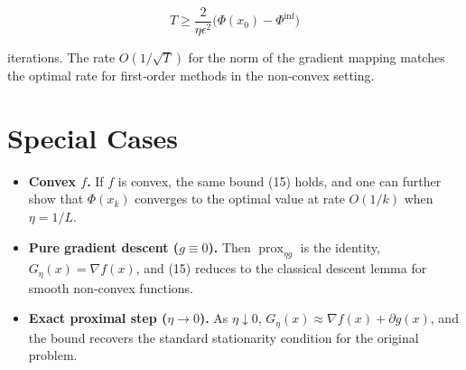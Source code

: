 \documentclass{article}
\newcommand{\prox}{\operatorname{prox}}
\newcommand{\grad}{\nabla}
\begin{document}
\[
T\ge \frac{2}{\eta\epsilon^{2}}\bigl(\Phi(x_{0})-\Phi^{\inf}\bigr)
\]

iterations.  The rate $O(1/\sqrt{T})$ for the norm of the gradient mapping matches the optimal rate for first‑order methods in the non‑convex setting.

\section*{Special Cases}
\begin{itemize}[nosep]
\item \textbf{Convex $f$.}  If $f$ is convex, the same bound (15) holds, and one can further show that $\Phi(x_{k})$ converges to the optimal value at rate $O(1/k)$ when $\eta=1/L$.
\item \textbf{Pure gradient descent ($g\equiv0$).}  Then $\prox_{\eta g}$ is the identity, $G_{\eta}(x)=\grad f(x)$, and (15) reduces to the classical descent lemma for smooth non‑convex functions.
\item \textbf{Exact proximal step ($\eta\to0$).}  As $\eta\downarrow0$, $G_{\eta}(x)\approx \grad f(x)+\partial g(x)$, and the bound recovers the standard stationarity condition for the original problem.
\end{itemize}
\end{document}
